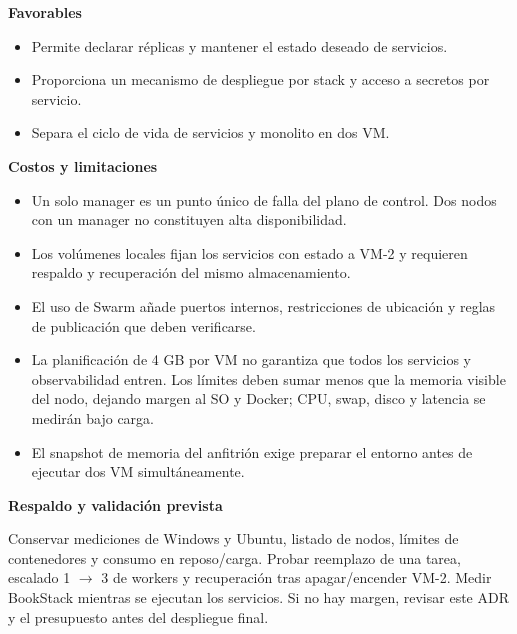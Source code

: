 \par\medskip\noindent\textbf{Favorables}\par\nobreak\smallskip

\begin{itemize}[leftmargin=1.5em,itemsep=3pt]
\item Permite declarar réplicas y mantener el estado deseado de servicios.
\item Proporciona un mecanismo de despliegue por stack y acceso a secretos por servicio.
\item Separa el ciclo de vida de servicios y monolito en dos VM.
\end{itemize}

\par\medskip\noindent\textbf{Costos y limitaciones}\par\nobreak\smallskip

\begin{itemize}[leftmargin=1.5em,itemsep=3pt]
\item Un solo manager es un punto único de falla del plano de control. Dos nodos con un manager no constituyen alta disponibilidad.
\item Los volúmenes locales fijan los servicios con estado a VM-2 y requieren respaldo y recuperación del mismo almacenamiento.
\item El uso de Swarm añade puertos internos, restricciones de ubicación y reglas de publicación que deben verificarse.
\item La planificación de 4 GB por VM no garantiza que todos los servicios y observabilidad entren. Los límites deben sumar menos que la memoria visible del nodo, dejando margen al SO y Docker; CPU, swap, disco y latencia se medirán bajo carga.
\item El snapshot de memoria del anfitrión exige preparar el entorno antes de ejecutar dos VM simultáneamente.
\end{itemize}

\par\medskip\noindent\textbf{Respaldo y validación prevista}\par\nobreak\smallskip

Conservar mediciones de Windows y Ubuntu, listado de nodos, límites de contenedores y consumo en reposo/carga. Probar reemplazo de una tarea, escalado 1 \ensuremath{\rightarrow} 3 de workers y recuperación tras apagar/encender VM-2. Medir BookStack mientras se ejecutan los servicios. Si no hay margen, revisar este ADR y el presupuesto antes del despliegue final.

